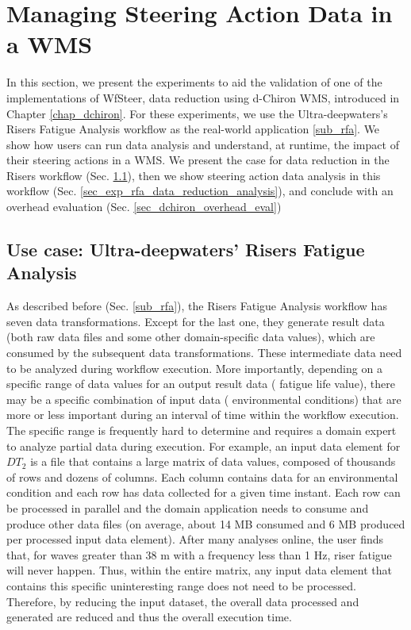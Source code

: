


\section{Managing Steering Action Data in a WMS}
\label{exps_wms}

In this section, we present the experiments to aid the validation of one of the implementations of WfSteer,
data reduction using d-Chiron WMS, introduced in Chapter \ref{chap_dchiron}.
For these experiments, we use the 
Ultra-deepwaters's Risers Fatigue Analysis workflow as the real-world application \ref{sub_rfa}.
We show how users can run data analysis and understand, at runtime, the impact of their steering actions in a WMS.
We present the case for data reduction in the Risers workflow 
(Sec. \ref{sec_exp_rfa_reduction}), then we show
steering action data analysis in this workflow 
(Sec. \ref{sec_exp_rfa_data_reduction_analysis}), and conclude with an overhead evaluation (Sec. \ref{sec_dchiron_overhead_eval})


\subsection{Use case: Ultra-deepwaters' Risers Fatigue Analysis}
\label{sec_exp_rfa_reduction}

As described before (Sec. \ref{sub_rfa}), the Risers Fatigue Analysis workflow has seven data transformations. 
Except for the last one, they generate result data (both raw data files and some other domain-specific data values), which are consumed by the
subsequent data transformations. 
These intermediate data need to be analyzed
during workflow execution. More importantly, depending on a specific
range of data values for an output result data (\eg{} fatigue
life value), there may be a specific combination of input data
(\eg{} environmental conditions) that are more or less important
during an interval of time within the workflow execution. The specific
range is frequently hard to determine and requires a domain expert to
analyze partial data during execution. For example, an input data
element for $DT_2$ is a file that contains a large matrix of data
values, composed of thousands of rows and dozens of columns. Each column
contains data for an environmental condition and each row has data
collected for a given time instant. Each row can be processed in
parallel and the domain application needs to consume and produce other
data files (on average, about 14 MB consumed and 6 MB produced per
processed input data element). After many analyses online, the user
finds that, for waves greater than 38 m with a frequency less than 1 Hz, 
riser fatigue will never happen. Thus, within the entire matrix, any
input data element that contains this specific uninteresting range does
not need to be processed. Therefore, by reducing the input dataset, the
overall data processed and generated are reduced and thus the overall
execution time.

